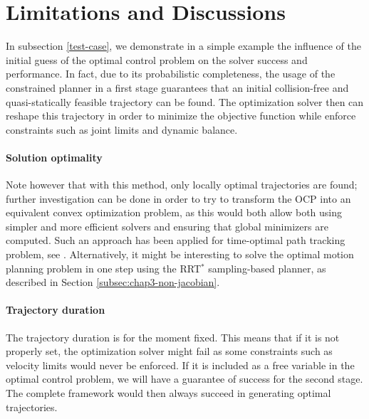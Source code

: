 \section{Limitations and Discussions}
\label{discussion}

In subsection \ref{test-case}, we demonstrate in a simple example the
influence of the initial guess of the optimal control problem on the
solver success and performance. In fact, due to its probabilistic
completeness, the usage of the constrained planner in a first stage
guarantees that an initial collision-free and quasi-statically
feasible trajectory can be found. The optimization solver then can
reshape this trajectory in order to minimize the objective function
while enforce constraints such as joint limits and dynamic
balance.

\paragraph{Solution optimality}
Note however that with this method, only locally optimal trajectories
are found; further investigation can be done in order to try to
transform the OCP into an equivalent convex optimization problem, as
this would both allow both using simpler and more efficient solvers
and ensuring that global minimizers are computed. Such an approach has
been applied for time-optimal path tracking problem, see
\cite{verscheure2009time}. Alternatively, it might be interesting to
solve the optimal motion planning problem in one step using the
RRT$^*$ sampling-based planner, as described in Section
\ref{subsec:chap3-non-jacobian}.

\paragraph{Trajectory duration}
The trajectory duration is for the moment fixed. This means that if it
is not properly set, the optimization solver might fail as some
constraints such as velocity limits would never be enforced. If it is
included as a free variable in the optimal control problem, we will
have a guarantee of success for the second stage. The complete
framework would then always succeed in generating optimal
trajectories.

